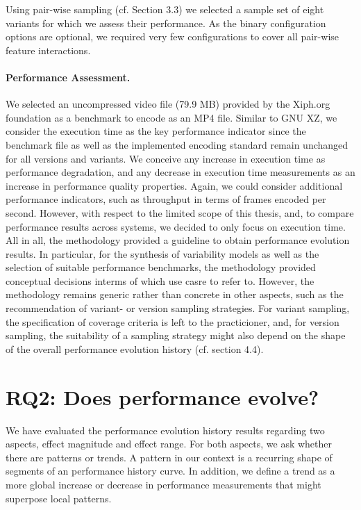 Using pair-wise sampling (cf. Section 3.3) we selected a sample set of eight
variants for which we assess their performance. As the binary configuration
options are optional, we required very few configurations to cover all
pair-wise feature interactions.

\paragraph{Performance Assessment.} We selected an uncompressed video file (79.9
MB) provided by the Xiph.org foundation as a benchmark to encode as an MP4 file.
Similar to GNU XZ, we consider the execution time as the key performance
indicator since the benchmark file as well as the implemented encoding standard
remain unchanged for all versions and variants. We conceive any increase in
execution time as performance degradation, and any decrease in execution time
measurements as an increase in performance quality properties. Again, we could
consider additional performance indicators, such as throughput in terms of
frames encoded per second. However, with respect to the limited scope of this
thesis, and, to compare performance results across systems, we decided to only
focus on execution time.\\

All in all, the methodology provided a guideline to obtain
performance evolution results. In particular, for the synthesis of variability
models as well as the selection of suitable performance benchmarks, the
methodology provided conceptual decisions interms of which use casre to refer
to. However, the methodology remains generic rather than concrete in other
aspects, such as the recommendation of variant- or version sampling strategies.
For variant sampling, the specification of coverage criteria is left to the
practicioner, and, for version sampling, the suitability of a sampling strategy
might also depend on the shape of the overall performance evolution history
(cf. section 4.4).

\section{RQ2: Does performance evolve?}\label{sec:expresults}
We have evaluated the performance evolution history results regarding two
aspects, effect magnitude and effect range. For both aspects, we ask whether
there are patterns or trends. A pattern in our context is a recurring shape of
segments of an performance history curve. In addition, we define a trend as a
more global increase or decrease in performance measurements that might
superpose local patterns.

